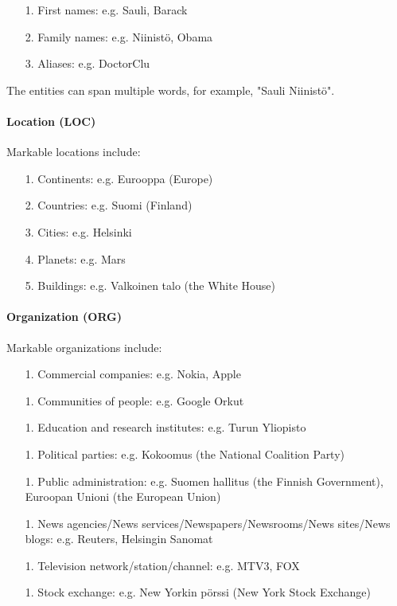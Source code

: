 \documentclass[11pt]{article}
\begin{document}
\begin{itemize}

\item[1.] First names: e.g. Sauli, Barack
\item[2.] Family names: e.g. Niinist\"o, Obama
\item[3.] Aliases: e.g. DoctorClu

\end{itemize}

The entities can span multiple words, for example, "Sauli Niinist\"o". 


\paragraph{Location (LOC)}

Markable locations include:

\begin{itemize}

\item[1.] Continents: e.g. Eurooppa (Europe)
\item[2.] Countries: e.g. Suomi (Finland)
\item[3.] Cities: e.g. Helsinki
\item[4.] Planets: e.g. Mars
\item[5.] Buildings: e.g. Valkoinen talo (the White House)



\end{itemize}


\paragraph{Organization (ORG)}

Markable organizations include:

\begin{itemize}

\item[1.] Commercial companies: e.g. Nokia, Apple
\item[1.] Communities of people: e.g. Google Orkut
\item[1.] Education and research institutes: e.g. Turun Yliopisto
\item[1.] Political parties: e.g. Kokoomus (the National Coalition Party)
\item[1.] Public administration: e.g. Suomen hallitus (the Finnish Government), Euroopan Unioni (the European Union) %
\item[1.] News agencies/News services/Newspapers/Newsrooms/News sites/News blogs: e.g. Reuters, Helsingin Sanomat
\item[1.] Television network/station/channel: e.g. MTV3, FOX
\item[1.] Stock exchange: e.g. New Yorkin p\"orssi (New York Stock Exchange)

\end{itemize}
\end{document}
